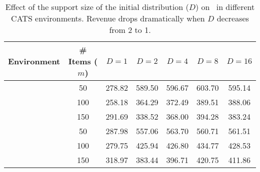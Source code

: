\begin{table}[t]
    \caption{Effect of the support size of the initial distribution ($D$) on \name~in different CATS environments. Revenue drops dramatically when $D$ decreases from 2 to 1. \label{tab:D}}
    \centering
    \begin{tabular}{ccccccc}
        \toprule
        \textbf{Environment} & \textbf{\# Items ($m$)} & $D=1$ & $D=2$ & $D=4$ & $D=8$ & $D=16$ \\
        \midrule
        & 50  & 278.82 & 589.50 & 596.67 & 603.70 & 595.14\\
        & 100 & 258.18 & 364.29 & 372.49 & 389.51 & 388.06 \\
        & 150 & 291.69 & 338.52 & 368.00 & 394.28 & 383.24 \\
        \midrule
        & 50  & 287.98 & 557.06 & 563.70 & 560.71 & 561.51\\
        & 100 & 279.75 & 425.94 & 426.80 & 434.77 & 428.53  \\
        & 150 & 318.97 & 383.44 & 396.71 & 420.75 & 411.86\\
        \bottomrule
    \end{tabular}
\end{table}
%
